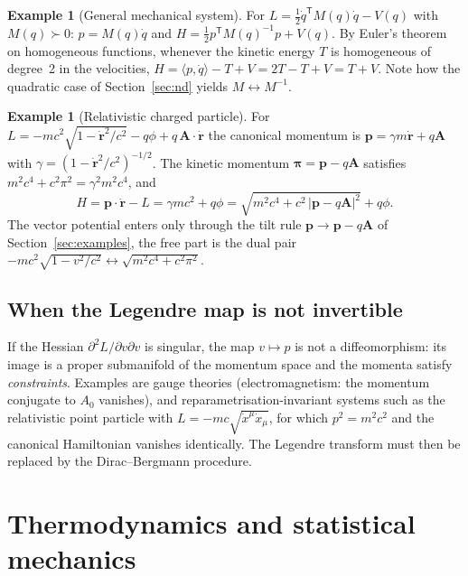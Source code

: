 \documentclass[11pt,a4paper]{article}
\newcommand{\ip}[2]{\langle #1,#2\rangle}
\theoremstyle{plain}
\theoremstyle{definition}
\newtheorem{example}[theorem]{Example}
\theoremstyle{remark}
\begin{document}
\begin{example}[General mechanical system]
For $L=\tfrac12\dot q^{\mathsf T}M(q)\dot q-V(q)$ with $M(q)\succ0$:
$p=M(q)\dot q$ and $H=\tfrac12p^{\mathsf T}M(q)^{-1}p+V(q)$.  By Euler's theorem
on homogeneous functions, whenever the kinetic energy $T$ is homogeneous of
degree~2 in the velocities, $H=\ip{p}{\dot q}-T+V=2T-T+V=T+V$.  Note how the
quadratic case of Section~\ref{sec:nd} yields $M\leftrightarrow M^{-1}$.
\end{example}

\begin{example}[Relativistic charged particle]
For $L=-mc^2\sqrt{1-\dot{\mathbf r}^2/c^2}-q\phi+q\,\mathbf A\cdot\dot{\mathbf r}$
the canonical momentum is $\mathbf p=\gamma m\dot{\mathbf r}+q\mathbf A$ with
$\gamma=(1-\dot{\mathbf r}^2/c^2)^{-1/2}$.  The kinetic momentum
$\boldsymbol\pi=\mathbf p-q\mathbf A$ satisfies
$m^2c^4+c^2\pi^2=\gamma^2m^2c^4$, and
\[
  H=\mathbf p\cdot\dot{\mathbf r}-L=\gamma mc^2+q\phi
   =\sqrt{m^2c^4+c^2\,|\mathbf p-q\mathbf A|^2}+q\phi .
\]
The vector potential enters only through the tilt rule $\mathbf p\to\mathbf p-q\mathbf A$
of Section~\ref{sec:examples}, the free part is the dual pair
$-mc^2\sqrt{1-v^2/c^2}\leftrightarrow\sqrt{m^2c^4+c^2\pi^2}$.
\end{example}

\subsection{When the Legendre map is not invertible}

If the Hessian $\partial^2L/\partial v\partial v$ is singular, the map
$v\mapsto p$ is not a diffeomorphism: its image is a proper submanifold of
the momentum space and the momenta satisfy \emph{constraints}.  Examples are
gauge theories (electromagnetism: the momentum conjugate to $A_0$ vanishes),
and reparametrisation-invariant systems such as the relativistic point
particle with $L=-mc\sqrt{\dot x^\mu\dot x_\mu}$, for which $p^2=m^2c^2$ and
the canonical Hamiltonian vanishes identically.  The Legendre transform must
then be replaced by the Dirac--Bergmann procedure.

\section{Thermodynamics and statistical mechanics}\label{sec:thermo}
\end{document}
